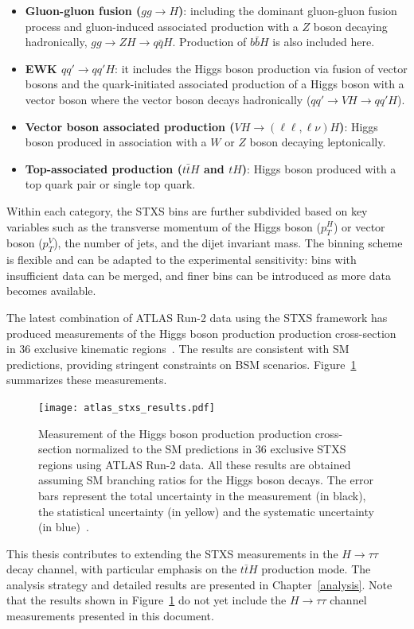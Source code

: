 \begin{itemize}
    \item \textbf{Gluon-gluon fusion ($gg \to H$)}: including the dominant gluon-gluon fusion process and gluon-induced associated production with a $Z$ boson decaying hadronically, $gg \to ZH \to q\bar{q}H$. Production of $b\bar{b}H$ is also included here.
    \item \textbf{EWK $qq'\to qq'H$}: it includes the Higgs boson production via fusion of vector bosons and the quark-initiated associated production of a Higgs boson with a vector boson where the vector boson decays hadronically ($qq'\to VH \to qq'H$).
    \item \textbf{Vector boson associated production ($VH \to (\ell \ell, \ell\nu)H$)}: Higgs boson produced in association with a $W$ or $Z$ boson decaying leptonically.
    \item \textbf{Top-associated production ($t\bar{t}H$ and $tH$)}: Higgs boson produced with a top quark pair or single top quark.
\end{itemize}

Within each category, the STXS bins are further subdivided based on key variables such as the transverse momentum of the Higgs boson ($p^H_T$) or vector boson ($p^V_T$), the number of jets, and the dijet invariant mass. The binning scheme is flexible and can be adapted to the experimental sensitivity: bins with insufficient data can be merged, and finer bins can be introduced as more data becomes available.

The latest combination of ATLAS Run-2 data using the STXS framework has produced measurements of the Higgs boson production production cross-section in 36 exclusive kinematic regions~\cite{Nature_ATLAS}. The results are consistent with SM predictions, providing stringent constraints on BSM scenarios. Figure~\ref{fig:atlas-stxs-results} summarizes these measurements.

\begin{figure}[htbp]
    \centering
    \texttt{[image: atlas\_stxs\_results.pdf]}
    \caption{Measurement of the Higgs boson production production cross-section normalized to the SM predictions in 36 exclusive STXS regions using ATLAS Run-2 data. All these results are obtained assuming SM branching ratios for the Higgs boson decays. The error bars represent the total uncertainty in the measurement (in black), the statistical uncertainty (in yellow) and the systematic uncertainty (in blue)~\cite{Nature_ATLAS}.}
    \label{fig:atlas-stxs-results}
\end{figure}

This thesis contributes to extending the STXS measurements in the $H \to \tau \tau$ decay channel, with particular emphasis on the $t\bar{t}H$ production mode. The analysis strategy and detailed results are presented in Chapter~\ref{analysis}. Note that the results shown in Figure~\ref{fig:atlas-stxs-results} do not yet include the $H \to \tau \tau$ channel measurements presented in this document.


